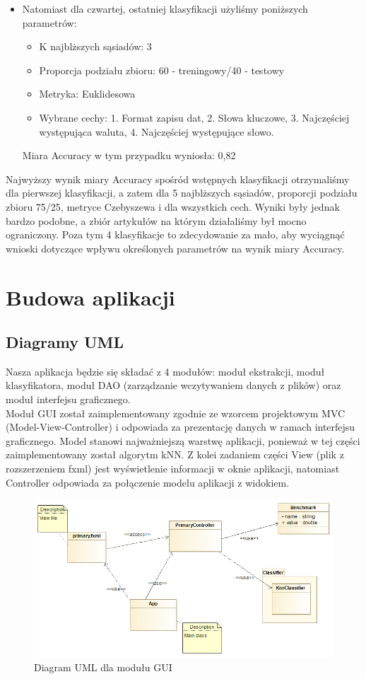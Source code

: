 \documentclass{classrep}
\begin{document}
\begin{itemize}
    \item Natomiast dla czwartej, ostatniej klasyfikacji użyliśmy poniższych parametrów:
     \begin{itemize}
        \item K najblższych sąsiadów: 3
        \item Proporcja podziału zbioru: 60 - treningowy/40 - testowy
        \item Metryka: Euklidesowa
        \item Wybrane cechy: 1. Format zapisu dat, 2. Słowa kluczowe, 3. Najczęściej występująca waluta, 4. Najczęściej występujące słowo.
    \end{itemize}
    Miara Accuracy w tym przypadku wyniosła: 0,82
\end{itemize}
Najwyższy wynik miary Accuracy spośród wstępnych klasyfikacji otrzymaliśmy dla pierwszej klasyfikacji, a zatem dla 5 najblższych sąsiadów, proporcji podziału zbioru 75/25, metryce Czebyszewa i dla wszystkich cech. Wyniki były jednak bardzo podobne, a zbiór artykułów na którym działaliśmy był mocno ograniczony. Poza tym 4 klasyfikacje to zdecydowanie za mało, aby wyciągnąć wnioski dotyczące wpływu określonych parametrów na wynik miary Accuracy. \\

\section{Budowa aplikacji}
\subsection{Diagramy UML}
Nasza aplikacja będzie się składać z 4 modułów: moduł ekstrakcji, moduł klasyfikatora, moduł DAO (zarządzanie wczytywaniem danych z plików) oraz moduł interfejsu graficznego. \\
\indent Moduł GUI został zaimplementowany zgodnie ze wzorcem projektowym MVC (Model-View-Controller) i odpowiada za prezentację danych w ramach interfejsu graficznego. Model stanowi najważniejszą warstwę aplikacji, ponieważ w tej części zaimplementowany został algorytm kNN. Z kolei zadaniem części View (plik z rozszerzeniem fxml) jest wyświetlenie informacji w oknie aplikacji, natomiast Controller odpowiada za połączenie modelu aplikacji z widokiem.

\begin{figure}[H]
    \centering
    \includegraphics[width=15cm]{modul_gui.png}
    \caption{Diagram UML dla modułu GUI}
\end{figure}
\end{document}
